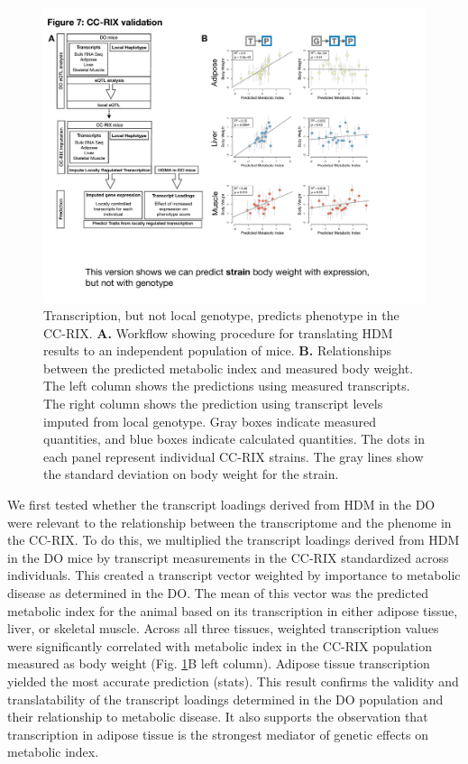 \documentclass[
]{article}
\begin{document}
\begin{figure}[ht!]
\includegraphics[width=\textwidth]{Figures/Fig7_CC_Prediction.pdf} 
\caption{Transcription, but not local genotype, predicts 
phenotype in the CC-RIX. \textbf{A.} Workflow showing procedure 
for translating HDM results to an independent population of mice. 
\textbf{B.} Relationships between the predicted metabolic index 
and measured body weight. The left column shows the predictions 
using measured transcripts. The right column shows the prediction 
using transcript levels imputed from local genotype. Gray boxes 
indicate measured quantities, and blue boxes indicate calculated 
quantities. The dots in each panel represent individual CC-RIX strains. 
The gray lines show the standard deviation on body weight for the strain.
}
\label{fig:cc_prediction}
\end{figure}

We first tested whether the transcript loadings derived from HDM in the
DO were relevant to the relationship between the transcriptome and the
phenome in the CC-RIX. To do this, we multiplied the transcript loadings
derived from HDM in the DO mice by transcript measurements in the CC-RIX
standardized across individuals. This created a transcript vector
weighted by importance to metabolic disease as determined in the DO. The
mean of this vector was the predicted metabolic index for the animal
based on its transcription in either adipose tissue, liver, or skeletal
muscle. Across all three tissues, weighted transcription values were
significantly correlated with metabolic index in the CC-RIX population
measured as body weight (Fig. \ref{fig:cc_prediction}B left column).
Adipose tissue transcription yielded the most accurate prediction
(stats). This result confirms the validity and translatability of the
transcript loadings determined in the DO population and their
relationship to metabolic disease. It also supports the observation that
transcription in adipose tissue is the strongest mediator of genetic
effects on metabolic index.
\end{document}
